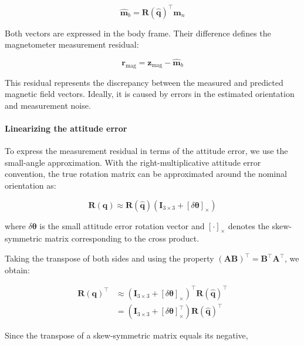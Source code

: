 \documentclass{article}
\begin{document}
	\begin{equation*}
		\hat{\mathbf{m}}_b =
		\mathbf{R}(\hat{\mathbf{q}})^\top \mathbf{m}_n
	\end{equation*}
	
	Both vectors are expressed in the body frame. Their difference defines the magnetometer measurement residual:
	
	\begin{equation*}
		\mathbf{r}_{\text{mag}} =
		\mathbf{z}_{\text{mag}} - \hat{\mathbf{m}}_b
	\end{equation*}
	
	This residual represents the discrepancy between the measured and predicted magnetic field vectors. Ideally, it is caused by errors in the estimated orientation and measurement noise.
	
	\paragraph{Linearizing the attitude error}
	
	To express the measurement residual in terms of the attitude error, we use the small-angle approximation. With the right-multiplicative attitude error convention, the true rotation matrix can be approximated around the nominal orientation as:
	
	\begin{equation*}
		\mathbf{R}(\mathbf{q}) \approx
		\mathbf{R}(\hat{\mathbf{q}})
		\left(\mathbf{I}_{3\times3}
		+ [\delta\boldsymbol{\theta}]_\times\right)
	\end{equation*}
	
	where $\delta\boldsymbol{\theta}$ is the small attitude error rotation vector and $[\cdot]_\times$ denotes the skew-symmetric matrix corresponding to the cross product.
	
	Taking the transpose of both sides and using the property $(\mathbf{A}\mathbf{B})^\top = \mathbf{B}^\top\mathbf{A}^\top$, we obtain:
	
	\begin{align*}
		\mathbf{R}(\mathbf{q})^\top
		&\approx
		\left(\mathbf{I}_{3\times3}
		+ [\delta\boldsymbol{\theta}]_\times\right)^\top
		\mathbf{R}(\hat{\mathbf{q}})^\top \\[4pt]
		&= \left(\mathbf{I}_{3\times3}
		+ [\delta\boldsymbol{\theta}]_\times^\top\right)
		\mathbf{R}(\hat{\mathbf{q}})^\top
	\end{align*}
	
	Since the transpose of a skew-symmetric matrix equals its negative,
	
\end{document}
